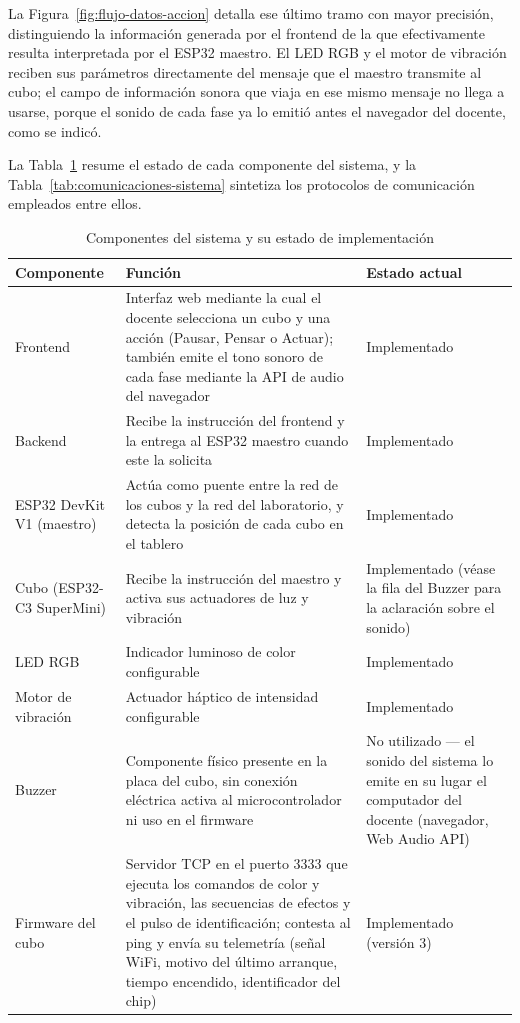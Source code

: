 \documentclass{book}
\begin{document}
La Figura~\ref{fig:flujo-datos-accion} detalla ese último tramo con
mayor precisión, distinguiendo la información generada por el
frontend de la que efectivamente resulta interpretada por el ESP32
maestro. El LED RGB y el motor de vibración reciben sus parámetros
directamente del mensaje que el maestro transmite al cubo; el campo
de información sonora que viaja en ese mismo mensaje no llega a
usarse, porque el sonido de cada fase ya lo emitió antes el navegador
del docente, como se indicó.

La Tabla~\ref{tab:componentes-sistema} resume el estado de cada
componente del sistema, y la Tabla~\ref{tab:comunicaciones-sistema}
sintetiza los protocolos de comunicación empleados entre ellos.

\begin{table}[H]
\centering
\caption{Componentes del sistema y su estado de implementación}
\label{tab:componentes-sistema}
\renewcommand{\arraystretch}{1.3}
\begin{tabular}{|p{2.8cm}|p{4.7cm}|p{3.0cm}|}
\hline
\textbf{Componente} & \textbf{Función} & \textbf{Estado actual} \\
\hline
Frontend & Interfaz web mediante la cual el docente selecciona un cubo y una acción (Pausar, Pensar o Actuar); también emite el tono sonoro de cada fase mediante la API de audio del navegador & Implementado \\
\hline
Backend & Recibe la instrucción del frontend y la entrega al ESP32 maestro cuando este la solicita & Implementado \\
\hline
ESP32 DevKit V1 (maestro) & Actúa como puente entre la red de los cubos y la red del laboratorio, y detecta la posición de cada cubo en el tablero & Implementado \\
\hline
Cubo (ESP32-C3 SuperMini) & Recibe la instrucción del maestro y activa sus actuadores de luz y vibración & Implementado (véase la fila del Buzzer para la aclaración sobre el sonido) \\
\hline
LED RGB & Indicador luminoso de color configurable & Implementado \\
\hline
Motor de vibración & Actuador háptico de intensidad configurable & Implementado \\
\hline
Buzzer & Componente físico presente en la placa del cubo, sin conexión eléctrica activa al microcontrolador ni uso en el firmware & No utilizado — el sonido del sistema lo emite en su lugar el computador del docente (navegador, Web Audio API) \\
\hline
Firmware del cubo & Servidor TCP en el puerto 3333 que ejecuta los comandos de color y vibración, las secuencias de efectos y el pulso de identificación; contesta al ping y envía su telemetría (señal WiFi, motivo del último arranque, tiempo encendido, identificador del chip) & Implementado (versión 3) \\
\hline
\end{tabular}
\end{table}
\end{document}
